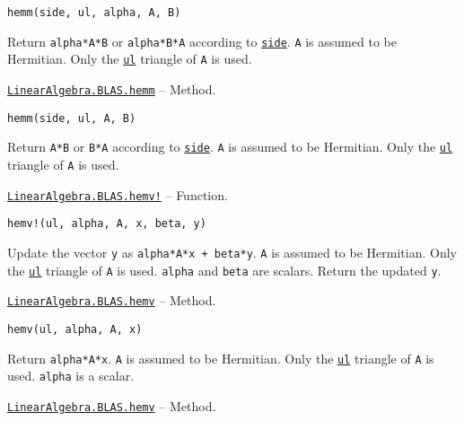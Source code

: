 \begin{adjustwidth}{2em}{0pt}


\begin{verbatim}
hemm(side, ul, alpha, A, B)
\end{verbatim}

Return \texttt{alpha*A*B} or \texttt{alpha*B*A} according to \hyperlink{3128026147631247774}{\texttt{side}}. \texttt{A} is assumed to be Hermitian. Only the \hyperlink{13880289478825450693}{\texttt{ul}} triangle of \texttt{A} is used.



\end{adjustwidth}
\hypertarget{9737054514544752244}{}
\hyperlink{9737054514544752244}{\texttt{LinearAlgebra.BLAS.hemm}}  -- {Method.}

\begin{adjustwidth}{2em}{0pt}


\begin{verbatim}
hemm(side, ul, A, B)
\end{verbatim}

Return \texttt{A*B} or \texttt{B*A} according to \hyperlink{3128026147631247774}{\texttt{side}}. \texttt{A} is assumed to be Hermitian. Only the \hyperlink{13880289478825450693}{\texttt{ul}} triangle of \texttt{A} is used.



\end{adjustwidth}
\hypertarget{9920007331130447492}{}
\hyperlink{9920007331130447492}{\texttt{LinearAlgebra.BLAS.hemv!}}  -- {Function.}

\begin{adjustwidth}{2em}{0pt}


\begin{verbatim}
hemv!(ul, alpha, A, x, beta, y)
\end{verbatim}

Update the vector \texttt{y} as \texttt{alpha*A*x + beta*y}. \texttt{A} is assumed to be Hermitian. Only the \hyperlink{13880289478825450693}{\texttt{ul}} triangle of \texttt{A} is used. \texttt{alpha} and \texttt{beta} are scalars. Return the updated \texttt{y}.



\end{adjustwidth}
\hypertarget{7197504470413629445}{}
\hyperlink{7197504470413629445}{\texttt{LinearAlgebra.BLAS.hemv}}  -- {Method.}

\begin{adjustwidth}{2em}{0pt}


\begin{verbatim}
hemv(ul, alpha, A, x)
\end{verbatim}

Return \texttt{alpha*A*x}. \texttt{A} is assumed to be Hermitian. Only the \hyperlink{13880289478825450693}{\texttt{ul}} triangle of \texttt{A} is used. \texttt{alpha} is a scalar.



\end{adjustwidth}
\hypertarget{16311314725872118357}{}
\hyperlink{16311314725872118357}{\texttt{LinearAlgebra.BLAS.hemv}}  -- {Method.}

